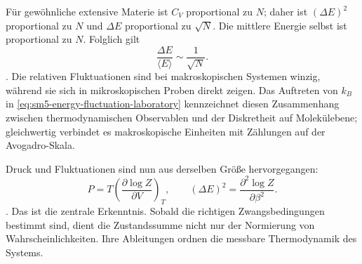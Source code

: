 \begin{classroomqa}\end{classroomqa}

Für gewöhnliche extensive Materie ist \(C_V\) proportional zu \(N\); daher ist \((\Delta E)^2\) proportional zu \(N\) und \(\Delta E\) proportional zu \(\sqrt{N}\). Die mittlere Energie selbst ist proportional zu \(N\). Folglich gilt \begin{equation}
 \frac{\Delta E}{\langle E\rangle}\sim\frac{1}{\sqrt{N}}.
 \label{eq:sm5-relative-fluctuation-scaling}
\end{equation}. Die relativen Fluktuationen sind bei makroskopischen Systemen winzig, während sie sich in mikroskopischen Proben direkt zeigen. Das Auftreten von \(k_B\) in \eqref{eq:sm5-energy-fluctuation-laboratory} kennzeichnet diesen Zusammenhang zwischen thermodynamischen Observablen und der Diskretheit auf Molekülebene; gleichwertig verbindet es makroskopische Einheiten mit Zählungen auf der Avogadro-Skala.

Druck und Fluktuationen sind nun aus derselben Größe hervorgegangen: \[
 P=T\left(\frac{\partial\log Z}{\partial V}\right)_T,
 \qquad
 (\Delta E)^2=\frac{\partial^2\log Z}{\partial\beta^2}.
\]. Das ist die zentrale Erkenntnis. Sobald die richtigen Zwangsbedingungen bestimmt sind, dient die Zustandssumme nicht nur der Normierung von Wahrscheinlichkeiten. Ihre Ableitungen ordnen die messbare Thermodynamik des Systems.